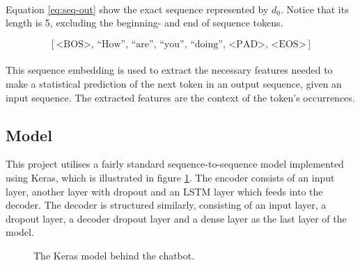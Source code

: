 \documentclass{article}
\begin{document}
\paragraph{}
Equation \ref{eq:seq-out} show the exact sequence represented by $d_0$. Notice
that its length is 5, excluding the beginning- and end of sequence tokens.

\begin{equation} \label{eq:seq-out}
  [ \textrm{<BOS>},\, \textrm{``How''},\, \textrm{``are''},\, \textrm{``you''},\,
    \textrm{``doing''},\, \textrm{<PAD>},\, \textrm{<EOS>} ]
\end{equation}

\paragraph{}
This sequence embedding is used to extract the necessary features needed to
make a statistical prediction of the next token in an output sequence, given an
input sequence. The extracted features are the context of the token's
occurrences.

\subsection*{Model}
This project utilises a fairly standard sequence-to-sequence model implemented
using Keras, which is illustrated in figure \ref{fig:keras-model}. The encoder
consists of an input layer, another layer with dropout and an LSTM layer which
feeds into the decoder. The decoder is structured similarly, consisting of an
input layer, a dropout layer, a decoder dropout layer and a dense layer as the
last layer of the model.

\begin{center}
  \begin{figure}[hbt]
    \centering
    \caption{The Keras model behind the chatbot.}
    \label{fig:keras-model}
  \end{figure}
\end{center}
\end{document}
